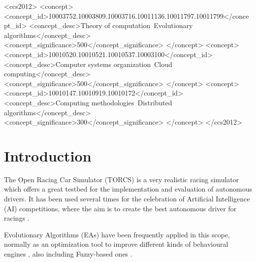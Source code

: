 \documentclass[sigconf]{acmart}
\begin{document}
\begin{CCSXML}
<ccs2012>
<concept>
<concept_id>10003752.10003809.10003716.10011136.10011797.10011799</concept_id>
<concept_desc>Theory of computation~Evolutionary algorithms</concept_desc>
<concept_significance>500</concept_significance>
</concept>
<concept>
<concept_id>10010520.10010521.10010537.10003100</concept_id>
<concept_desc>Computer systems organization~Cloud computing</concept_desc>
<concept_significance>500</concept_significance>
</concept>
<concept>
<concept_id>10010147.10010919.10010172</concept_id>
<concept_desc>Computing methodologies~Distributed algorithms</concept_desc>
<concept_significance>300</concept_significance>
</concept>
</ccs2012>
\end{CCSXML}



%


\maketitle

\section{Introduction}
\label{sec:intro}

The Open Racing Car Simulator (TORCS) \cite{WebTORCS} is a very realistic racing simulator which offers a great testbed for the implementation and evaluation of autonomous drivers. 
It has been used several times for the celebration of Artificial Intelligence (AI) competitions, where the aim is to create the best autonomous driver for racings \cite{torcs5,manualTORCS,Torcs3,torcs7,oponnents2010}. 


Evolutionary Algorithms (EAs) \cite{EAs_Back96} have been frequently applied in this scope, normally as an optimization tool to improve different kinds of behavioural engines \cite{Floreano2004,CarRacing_Pelta09,SAES2012,QuadfliegMO,torcs2012}, also including Fuzzy-based ones \cite{Guadarrama2008, LFAG, PerezEvolvingFuzzy09}.
\end{document}
